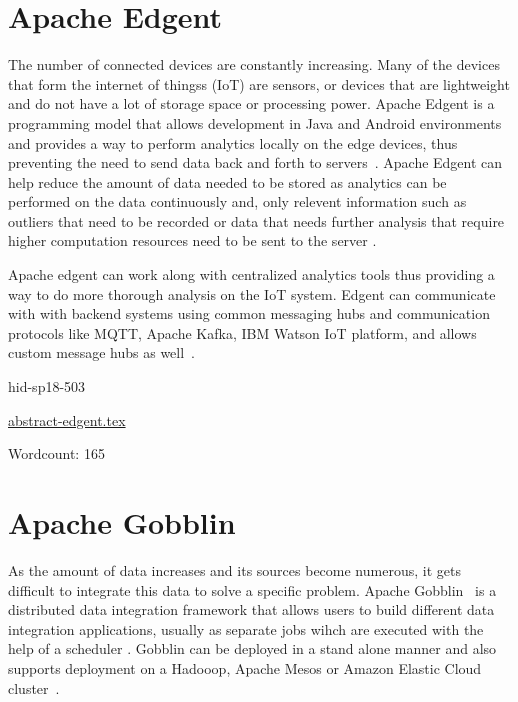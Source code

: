 \section{Apache Edgent}

The number of connected devices are constantly increasing.
Many of the devices that form the internet of thingss (IoT) are sensors,
or devices that are lightweight and do not have a lot of storage space
or processing power.
Apache Edgent is a programming model that allows development in Java and
Android environments and provides a way to perform analytics locally on
the edge devices, thus preventing the need to send data back and forth to
servers~\cite{hid-sp18-503-www-edgent}. Apache Edgent can help reduce
the amount of data needed to be stored as analytics can be performed on
the data continuously and, only relevent information such as outliers
that need to be recorded or data that needs further analysis that require
higher computation resources need to be sent to the server
\cite{hid-sp18-503-www-edgent-docs}.

Apache edgent can work along with centralized analytics tools thus providing
a way to do more thorough analysis on the IoT system. Edgent can
communicate with with backend systems using common messaging hubs and
communication protocols like MQTT, Apache Kafka, IBM Watson IoT platform,
and allows custom message hubs as well~\cite{hid-sp18-503-www-edgent-docs}.


\begin{IU}

hid-sp18-503

\href{https://github.com/cloudmesh-community/hid-sp18-503/blob/master//technology/abstract-edgent.tex}{abstract-edgent.tex}

 

Wordcount: 165

\end{IU}

\section{Apache Gobblin}

As the amount of data increases and its sources become numerous, it
gets difficult to integrate this data to solve a specific
problem. Apache Gobblin~\cite{hid-sp18-503-www-gobblin} is a distributed
data integration framework that allows users to build different data
integration applications, usually as separate jobs wihch are executed
with the help of a scheduler
\cite{hid-sp18-503-www-gobblin-docs}. Gobblin can be deployed in a
stand alone manner and also supports deployment on a Hadooop, Apache
Mesos or Amazon Elastic Cloud cluster~\cite{hid-sp18-503-www-gobblin}.

